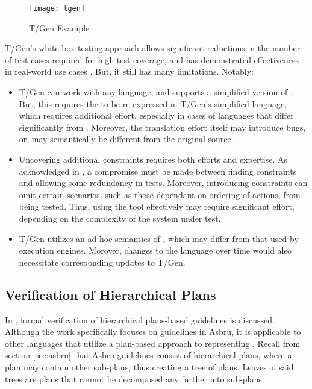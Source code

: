 \begin{figure}[b!]
  \centering
  \texttt{[image: tgen]}
  \caption{T/Gen Example}\label{fig:tgen-example}
\end{figure}

T/Gen's white-box testing approach allows significant reductions in the
number of test cases required for high test-coverage, and has demonstrated
effectiveness in real-world use cases \cite{MillerJAMIA01}. But, it still has
many limitations. Notably:
\begin{itemize}
  \item T/Gen can work with any \CIG{} language, and supports
  a simplified version of \GLIF{}. But, this requires the \CIG{} to
  be re-expressed in T/Gen's simplified language,
  which requires additional effort, especially in cases of languages that differ
    significantly from \GLIF{}. Moreover, the translation effort itself may
    introduce bugs, or, may semantically be different from the original source.
  \item Uncovering additional constraints requires both efforts and expertise.
    As acknowledged in \cite{MillerJAMIA01}, a compromise must be made between
    finding constraints and allowing some redundancy in tests. Moreover,
    introducing constraints can omit certain scenarios, such
    as those dependant on ordering of actions, from being tested.
    Thus, using the tool effectively may require significant effort, depending
    on the complexity of the system under test.
  \item T/Gen utilizes an ad-hoc semantics of \GLIF{}, which may differ from
    that used by \GLIF{} execution engines. Morover, changes to the \GLIF{} language
    over time would also necessitate corresponding updates to T/Gen.
\end{itemize}

\subsection{Verification of Hierarchical Plans}\label{sec:asbru-verification}

In \cite{DuftschmidAIM01}, formal verification of hierarchical plans-based
guidelines is discussed. Although the work specifically focuses on guidelines in
Asbru, it is applicable to other languages that utilize a plan-based approach
to representing \BPGs{}. Recall from section \ref{sec:asbru} that Asbru guidelines
consist of hierarchical plans, where a plan may contain other sub-plans,
thus creating a tree of plans. Leaves of said trees are plans that cannot
be decomposed any further into sub-plans.

